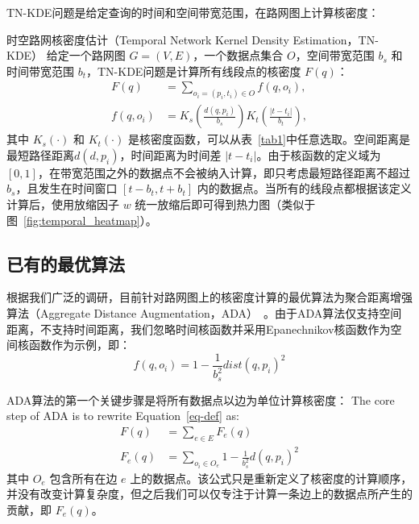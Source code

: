 TN-KDE问题是给定查询的时间和空间带宽范围，在路网图上计算核密度：
\begin{definition}{时空路网核密度估计（Temporal Network Kernel Density Estimation，TN-KDE）}
	给定一个路网图 $G=(V, E)$，一个数据点集合 $O$，空间带宽范围 $b_s$ 和时间带宽范围 $b_t$，TN-KDE问题是计算所有线段点的核密度 $F(q)$：
\begin{equation}
\label{eq-def}
\begin{aligned}
	F(q) &= \sum_{o_i=(p_i, t_i) \in O} f(q, o_i), \\
	f(q, o_i) &= 
	K_s\left(\frac{d(q, p_i)}{b_s}\right)
	K_t\left(\frac{\vert t - t_i \vert}{b_t}\right),
\end{aligned}
\end{equation}
其中 $K_s(\cdot)$ 和 $K_t(\cdot)$ 是核密度函数，可以从表~\ref{tab1}中任意选取。空间距离是最短路径距离$d(d, p_i)$，时间距离为时间差 $\vert t - t_i \vert$。由于核函数的定义域为 $[0,1]$，在带宽范围之外的数据点不会被纳入计算，即只考虑最短路径距离不超过 $b_s$，且发生在时间窗口 $[t - b_t, t + b_t]$ 内的数据点。当所有的线段点都根据该定义计算后，使用放缩因子 $w$ 统一放缩后即可得到热力图（类似于图~\ref{fig:temporal_heatmap}）。
\end{definition}





\subsection{已有的最优算法}
\label{sec:sota}

根据我们广泛的调研，目前针对路网图上的核密度计算的最优算法为聚合距离增强算法（Aggregate Distance Augmentation，ADA）~\cite{chan_fast_2021}。由于ADA算法仅支持空间距离，不支持时间距离，我们忽略时间核函数并采用Epanechnikov核函数作为空间核函数作为示例，即：
\begin{equation*}
	f(q, o_i) = 1 - \frac{1}{b_s^2} dist(q, p_i)^2
\end{equation*}

ADA算法的第一个关键步骤是将所有数据点以边为单位计算核密度：
The core step of ADA is to rewrite Equation~\ref{eq-def} as:
\begin{equation*}
\label{eq-transform}
\begin{aligned}
	F(q) &= \sum_{e \in E} F_e(q) \\
	F_e(q) &= \sum_{o_i \in O_e} 1 - \frac{1}{b_s^2} d(q, p_i)^2
\end{aligned}
\end{equation*}
其中 $O_e$ 包含所有在边 $e$ 上的数据点。该公式只是重新定义了核密度的计算顺序，并没有改变计算复杂度，但之后我们可以仅专注于计算一条边上的数据点所产生的贡献，即 $F_e(q)$。

